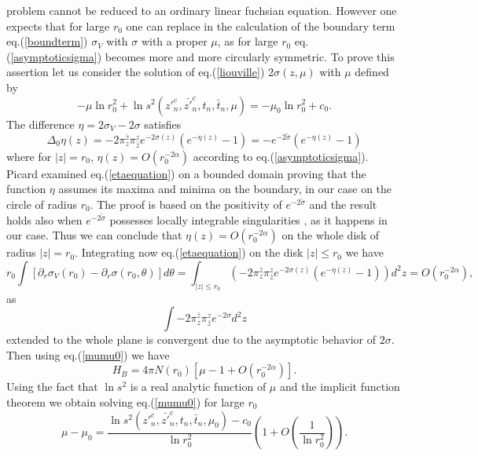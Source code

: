 \documentclass[a4paper,12pt]{article}
\begin{document}
problem cannot be reduced to an ordinary linear fuchsian
equation. However one expects that for large $r_0$ one can replace in
the calculation of the boundary term eq.(\ref{boundterm})
$\sigma_V$ with $\sigma$ with a proper $\mu$, as for large $r_0$
eq.(\ref{asymptoticsigma}) becomes more and more circularly symmetric. To
prove this assertion
let us consider the solution of eq.(\ref{liouville}) $2\sigma(z,\mu)$
with $\mu$ defined by
\begin{equation}\label{mumu0}
-\mu\ln r^2_0 +\ln s^2({z'}^c_n, \bar {z'}^c_n,t_n,\bar t_n,\mu) 
= -\mu_0\ln r_0^2+c_0. 
\end{equation}
The difference $\eta = 2\sigma_V-2\sigma$ satisfies  
\begin{equation}\label{etaequation}
\Delta_0\eta(z) = -2 \pi^{\bar z}_z \pi^{z}_{\bar z}
e^{-2\sigma(z)}(e^{-\eta(z)}-1) = - e^{-2\tilde\sigma}(e^{-\eta(z)}-1)
\end{equation}
where for $|z|=r_0$, $\eta(z) = O(r_0^{-2\alpha})$ according to
eq.(\ref{asymptoticsigma}). Picard \cite{picard} examined
eq.(\ref{etaequation}) on a bounded domain proving that the function
$\eta$ assumes its maxima and minima on the boundary, in our case on
the circle of radius $r_0$. The proof is based on the positivity of
$e^{-2\tilde\sigma}$ and the result holds also when
$e^{-2\tilde\sigma}$ possesses locally integrable singularities
\cite{picard}, as it happens in our case. Thus we can conclude that
$\eta(z)= O(r_0^{-2\alpha})$ on the whole disk of radius $|z|=r_0$.
Integrating now eq.(\ref{etaequation}) on the disk $|z|\leq r_0$ we have
\begin{equation}
r_0\int[\partial_r\sigma_V(r_0)-\partial_r\sigma(r_0,\theta)] d \theta=
\int_{|z|\leq r_0} 
\left(- 2 \pi^{\bar z}_z \pi^{z}_{\bar z}
e^{-2\sigma(z)}(e^{-\eta(z)}-1)\right)d^2z 
=O(r_0^{-2\alpha}), 
\end{equation}
as 
\begin{equation}
\int -2\pi^{\bar z}_z\pi^z_{\bar z} e^{-2\sigma} d^2 z
\end{equation}
extended to the whole plane is convergent due to the asymptotic
behavior of $2\sigma$.
Then using eq.(\ref{mumu0}) we have
\begin{equation}
H_B =4\pi N(r_0) [\mu-1+O(r_0^{-2\alpha})].
\end{equation}
Using the fact that $\ln s^2$ is a real analytic function of $\mu$
\cite{CMS3} and 
the implicit function theorem \cite{rudin} we obtain solving
eq.(\ref{mumu0}) for large 
$r_0$ 
\begin{equation}
\mu-\mu_0 =\frac{\ln s^2({z'}^c_n,\bar{z'}^c_n, t_n,\bar t_n,\mu_0)-c_0}{\ln
r_0^2}\left(1+O(\frac{1}{\ln r^2_0})\right). 
\end{equation}
\end{document}
